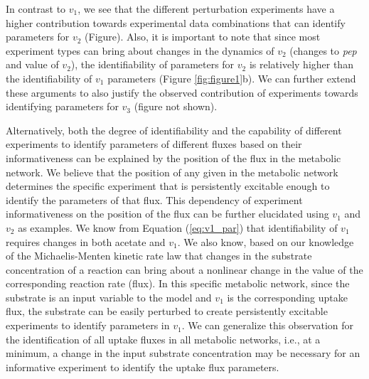 \documentclass[10pt]{article}
\begin{document}
In contrast to $v_1$, we see that the different perturbation experiments have a higher contribution towards experimental data combinations that can identify parameters for $v_2$ (Figure). Also, it is important to note that since most experiment types can bring about changes in the dynamics of $v_2$ (changes to \textit{pep} and value of $v_2$), the identifiability of parameters for $v_2$ is relatively higher than the identifiability of $v_1$ parameters (Figure \ref{fig:figure1}b). We can further extend these arguments to also justify the observed contribution of experiments towards identifying parameters for $v_3$ (figure not shown).

Alternatively, both the degree of identifiability and the capability of different experiments to identify parameters of different fluxes based on their informativeness can be explained by the position of the flux in the metabolic network. We believe that the position of any given in the metabolic network determines the specific experiment that is persistently excitable enough to identify the parameters of that flux. This dependency of experiment informativeness on the position of the flux can be further elucidated using $v_1$ and $v_2$ as examples. We know from Equation (\ref{eq:v1_par}) that identifiability of $v_1$ requires changes in both acetate and $v_1$. We also know, based on our knowledge of the Michaelis-Menten kinetic rate law that changes in the substrate concentration of a reaction can bring about a nonlinear change in the value of the corresponding reaction rate (flux). In this specific metabolic network, since the substrate is an input variable to the model and $v_1$ is the corresponding uptake flux, the substrate can be easily perturbed to create persistently excitable experiments to identify parameters in $v_1$. We can generalize this observation for the identification of all uptake fluxes in all metabolic networks, i.e., at a minimum, a change in the input substrate concentration may be necessary for an informative experiment to identify the uptake flux parameters.
\end{document}
